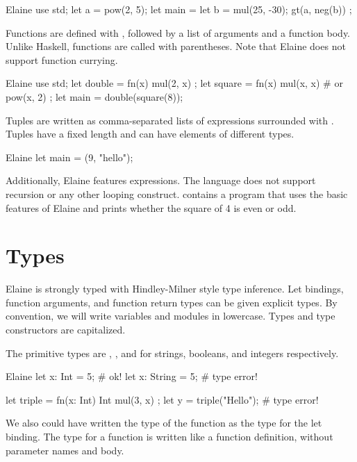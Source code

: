 \begin{lst}{Elaine}
use std;
let a = pow(2, 5);
let main = {
    let b = mul(25, -30);
    gt(a, neg(b))
};
\end{lst}
%
Functions are defined with , followed by a list of arguments and a function body. Unlike Haskell, functions are called with parentheses. Note that Elaine does not support function currying.

\begin{lst}{Elaine}
use std;
let double = fn(x) {
    mul(2, x)
};
let square = fn(x) {
    mul(x, x) # or pow(x, 2)
};
let main = double(square(8));
\end{lst}
%
Tuples are written as comma-separated lists of expressions surrounded with \el{()}. Tuples have a fixed length and can have elements of different types.

\begin{lst}{Elaine}
let main = (9, "hello");
\end{lst}
%
Additionally, Elaine features  expressions. The language does not support recursion or any other looping construct.  contains a program that uses the basic features of Elaine and prints whether the square of 4 is even or odd. 


\section{Types}

Elaine is strongly typed with Hindley-Milner style type inference. Let bindings, function arguments, and function return types can be given explicit types. By convention, we will write variables and modules in lowercase. Types and type constructors are capitalized.

The primitive types are , , and  for strings, booleans, and integers respectively.

\begin{lst}{Elaine}
let x: Int = 5;       # ok!
let x: String = 5;    # type error!

let triple = fn(x: Int) Int { mul(3, x) };
let y = triple("Hello");  # type error!
\end{lst}
%
We also could have written the type of the function as the type for the let binding. The type for a function is written like a function definition, without parameter names and body.

